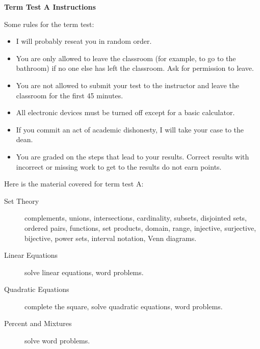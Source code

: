 \documentclass[11pt]{article}
\begin{document}
\textbf{Term Test A Instructions}

Some rules for the term test:
\begin{itemize}
\item I will probably reseat you in random order.
\item You are only allowed to leave the classroom (for example, to go
  to the bathroom) if no one else has left the classroom. Ask for
  permission to leave. 
\item You are not allowed to submit your test to the instructor and
  leave the classroom for the first 45 minutes.
\item All electronic devices must be turned off except for a
  basic calculator.
\item If you commit an act of academic dishonesty, I will take your
  case to the dean.
\item You are graded on the steps that lead to your results. Correct
  results with incorrect or missing work to get to the results do not
  earn points.
\end{itemize}

Here is the material covered for term test A:
\begin{description}
\item[Set Theory] complements, unions, intersections, cardinality,
  subsets, disjointed sets, ordered pairs, functions, set products,
  domain, range, injective, surjective, bijective, power sets,
  interval notation, Venn diagrams.
\item[Linear Equations] solve linear equations, word problems.
\item[Quadratic Equations] complete the square, solve quadratic
  equations, word problems.
\item[Percent and Mixtures] solve word problems.
\end{description}
\end{document}
